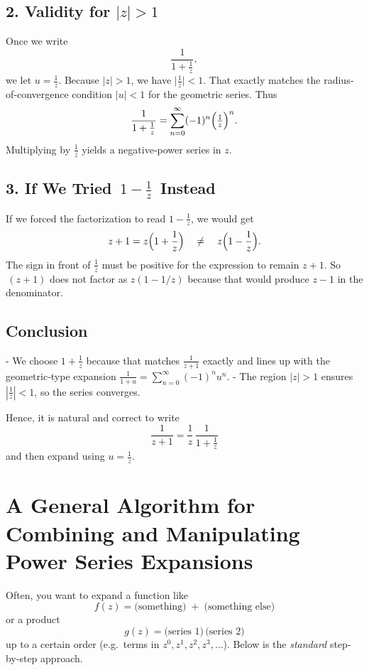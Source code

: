 \documentclass[12pt]{article}
\theoremstyle{definition} %
\theoremstyle{plain} %
\begin{document}
\subsection*{2. Validity for \(|z|>1\)}

Once we write
\[
\frac{1}{1 + \frac{1}{z}},
\]
we let \(u = \frac{1}{z}\). Because \(|z|>1\), we have \(\bigl|\tfrac{1}{z}\bigr| < 1\). That exactly matches the radius‐of‐convergence condition \(|u|<1\) for the geometric series. Thus
\[
\frac{1}{1 + \frac{1}{z}}
= \sum_{n=0}^\infty (-1)^n \Bigl(\tfrac{1}{z}\Bigr)^n.
\]
Multiplying by \(\frac{1}{z}\) yields a negative‐power series in \(z\).  

\subsection*{3. If We Tried \(\,1 - \tfrac{1}{z}\,\) Instead}

If we forced the factorization to read \(1 - \tfrac{1}{z}\), we would get
\[
z + 1 = z\Bigl(1 + \frac{1}{z}\Bigr) 
\quad\neq\quad
z\Bigl(1 - \frac{1}{z}\Bigr).
\]
The sign in front of \(\tfrac{1}{z}\) must be positive for the expression to remain \(z+1\). So \(\,(z+1)\) does not factor as \(z(1 - 1/z)\) because that would produce \(z - 1\) in the denominator. 

\subsection*{Conclusion}

- We choose \(1 + \tfrac{1}{z}\) because that matches \(\frac{1}{z+1}\) exactly and lines up with the geometric‐type expansion 
\(\tfrac{1}{1+u} = \sum_{n=0}^\infty (-1)^n u^n\).
- The region \(|z|>1\) ensures \(\left|\tfrac{1}{z}\right|<1\), so the series converges.  

Hence, it is natural and correct to write
\[
\frac{1}{z+1} 
= \frac{1}{z}\,\frac{1}{1 + \frac{1}{z}}
\]
and then expand using \(u = \tfrac{1}{z}\).

\section*{A General Algorithm for Combining and Manipulating Power Series Expansions}

Often, you want to expand a function like
\[
f(z) = \bigl(\text{something}\bigr) \;+\; \bigl(\text{something else}\bigr)
\]
or a product
\[
g(z) = \bigl(\text{series 1}\bigr)\,\bigl(\text{series 2}\bigr)
\]
up to a certain order (e.g.\ terms in $z^0, z^1, z^2, z^3, \dots$). Below is the \emph{standard} step‐by‐step approach.
\end{document}
